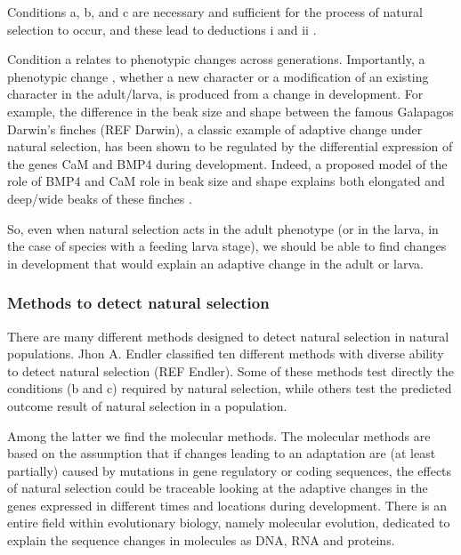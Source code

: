Conditions a, b, and c are necessary and sufficient for the process of natural selection to occur, and these lead to deductions i and ii \citep{endler1986natural}.

Condition a relates to phenotypic changes across generations. Importantly, a phenotypic change , whether a new character or a modification of an existing character in the adult/larva, is produced from a change in development.
For example, the difference in the beak size and shape between the famous Galapagos Darwin's finches (REF Darwin), a classic example of adaptive change under natural selection, has been shown to be regulated by the differential expression of the genes CaM 
and BMP4 
during development. Indeed, a proposed model of the role of BMP4 and CaM role in beak size and shape explains both elongated and deep/wide beaks of these finches
	\citep{Abzhanov2006}.

So, even when natural selection acts in the adult phenotype (or in the larva, in the case of species with a feeding larva stage), we should be able to find changes in development that would explain an adaptive change in the adult or larva.

\subsubsection{Methods to detect natural selection}

There are many different methods designed to detect natural selection in natural populations. Jhon A. Endler classified ten different methods with diverse ability to detect natural selection (REF Endler). Some of these methods test directly the conditions (b and c) required by natural selection, while others test the predicted outcome result of natural selection in a population.

Among the latter we find the molecular methods. The molecular methods are based on the assumption that if changes leading to an adaptation are (at least partially) caused by mutations in gene regulatory or coding sequences, the effects of natural selection could be traceable looking at the adaptive changes in the genes expressed in different times and locations during development. There is an entire field within evolutionary biology, namely molecular evolution, dedicated to explain the sequence changes in molecules as DNA,
RNA 
and proteins. 

